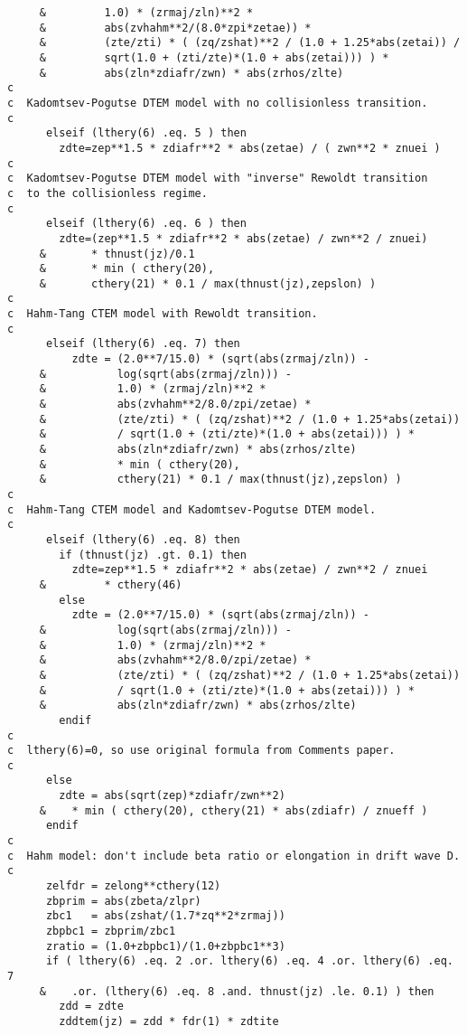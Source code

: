\begin{verbatim}
     &         1.0) * (zrmaj/zln)**2 *
     &         abs(zvhahm**2/(8.0*zpi*zetae)) *
     &         (zte/zti) * ( (zq/zshat)**2 / (1.0 + 1.25*abs(zetai)) /
     &         sqrt(1.0 + (zti/zte)*(1.0 + abs(zetai))) ) *
     &         abs(zln*zdiafr/zwn) * abs(zrhos/zlte)
c
c  Kadomtsev-Pogutse DTEM model with no collisionless transition.
c
      elseif (lthery(6) .eq. 5 ) then
        zdte=zep**1.5 * zdiafr**2 * abs(zetae) / ( zwn**2 * znuei )
c
c  Kadomtsev-Pogutse DTEM model with "inverse" Rewoldt transition
c  to the collisionless regime.
c
      elseif (lthery(6) .eq. 6 ) then
        zdte=(zep**1.5 * zdiafr**2 * abs(zetae) / zwn**2 / znuei)
     &       * thnust(jz)/0.1
     &       * min ( cthery(20),
     &       cthery(21) * 0.1 / max(thnust(jz),zepslon) )
c
c  Hahm-Tang CTEM model with Rewoldt transition.
c
      elseif (lthery(6) .eq. 7) then
          zdte = (2.0**7/15.0) * (sqrt(abs(zrmaj/zln)) -
     &           log(sqrt(abs(zrmaj/zln))) -
     &           1.0) * (zrmaj/zln)**2 *
     &           abs(zvhahm**2/8.0/zpi/zetae) *
     &           (zte/zti) * ( (zq/zshat)**2 / (1.0 + 1.25*abs(zetai))
     &           / sqrt(1.0 + (zti/zte)*(1.0 + abs(zetai))) ) *
     &           abs(zln*zdiafr/zwn) * abs(zrhos/zlte)
     &           * min ( cthery(20),
     &           cthery(21) * 0.1 / max(thnust(jz),zepslon) )
c
c  Hahm-Tang CTEM model and Kadomtsev-Pogutse DTEM model.
c
      elseif (lthery(6) .eq. 8) then
        if (thnust(jz) .gt. 0.1) then
          zdte=zep**1.5 * zdiafr**2 * abs(zetae) / zwn**2 / znuei
     &         * cthery(46)
        else
          zdte = (2.0**7/15.0) * (sqrt(abs(zrmaj/zln)) -
     &           log(sqrt(abs(zrmaj/zln))) -
     &           1.0) * (zrmaj/zln)**2 *
     &           abs(zvhahm**2/8.0/zpi/zetae) *
     &           (zte/zti) * ( (zq/zshat)**2 / (1.0 + 1.25*abs(zetai))
     &           / sqrt(1.0 + (zti/zte)*(1.0 + abs(zetai))) ) *
     &           abs(zln*zdiafr/zwn) * abs(zrhos/zlte)
        endif
c
c  lthery(6)=0, so use original formula from Comments paper.
c
      else
        zdte = abs(sqrt(zep)*zdiafr/zwn**2)
     &    * min ( cthery(20), cthery(21) * abs(zdiafr) / znueff )
      endif
c
c  Hahm model: don't include beta ratio or elongation in drift wave D.
c
      zelfdr = zelong**cthery(12)
      zbprim = abs(zbeta/zlpr)
      zbc1   = abs(zshat/(1.7*zq**2*zrmaj))
      zbpbc1 = zbprim/zbc1
      zratio = (1.0+zbpbc1)/(1.0+zbpbc1**3)
      if ( lthery(6) .eq. 2 .or. lthery(6) .eq. 4 .or. lthery(6) .eq. 7
     &    .or. (lthery(6) .eq. 8 .and. thnust(jz) .le. 0.1) ) then
        zdd = zdte
        zddtem(jz) = zdd * fdr(1) * zdtite

\end{verbatim}
